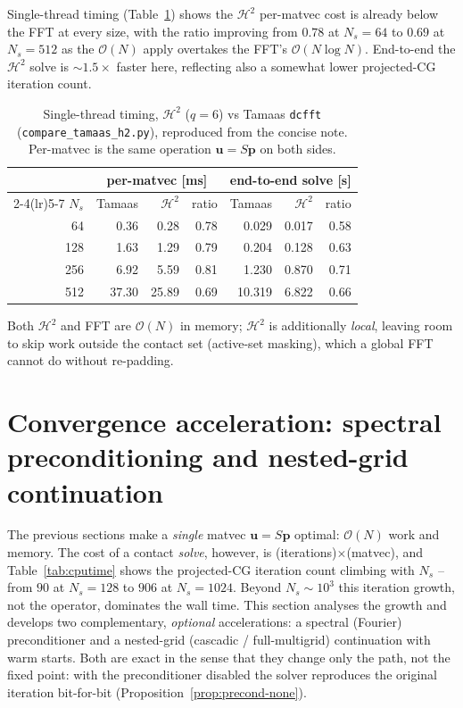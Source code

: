 \documentclass[11pt,a4paper]{article}
\newcommand{\Order}{\mathcal{O}}
\newcommand{\pp}{\mathbf{p}}
\newcommand{\Htwo}{\mathcal{H}^2}
\newcommand{\code}[1]{\texttt{#1}}
\theoremstyle{definition}
\theoremstyle{remark}
\begin{document}
Single-thread timing (Table~\ref{tab:tamaas-time}) shows the $\Htwo$ per-matvec
cost is already below the FFT at every size, with the ratio improving from $0.78$
at $N_s=64$ to $0.69$ at $N_s=512$ as the $\Order(N)$ apply overtakes the FFT's
$\Order(N\log N)$. End-to-end the $\Htwo$ solve is $\sim1.5\times$ faster here,
reflecting also a somewhat lower projected-CG iteration count.

\begin{table}[h]
\centering
\begin{tabular}{rrrrrrr}
\toprule
& \multicolumn{3}{c}{per-matvec [ms]} & \multicolumn{3}{c}{end-to-end solve [s]} \\
\cmidrule(lr){2-4}\cmidrule(lr){5-7}
$N_s$ & Tamaas & $\Htwo$ & ratio & Tamaas & $\Htwo$ & ratio \\
\midrule
64  &  0.36 &  0.28 & 0.78 &  0.029 & 0.017 & 0.58 \\
128 &  1.63 &  1.29 & 0.79 &  0.204 & 0.128 & 0.63 \\
256 &  6.92 &  5.59 & 0.81 &  1.230 & 0.870 & 0.71 \\
512 & 37.30 & 25.89 & 0.69 & 10.319 & 6.822 & 0.66 \\
\bottomrule
\end{tabular}
\caption{Single-thread timing, $\Htwo$ ($q=6$) vs Tamaas \code{dcfft}
(\code{compare\_tamaas\_h2.py}), reproduced from the concise note. Per-matvec is
the same operation $\mathbf u=S\pp$ on both sides.}
\label{tab:tamaas-time}
\end{table}

Both $\Htwo$ and FFT are $\Order(N)$ in memory; $\Htwo$ is additionally
\emph{local}, leaving room to skip work outside the contact set (active-set
masking), which a global FFT cannot do without re-padding.

\section{Convergence acceleration: spectral preconditioning and nested-grid continuation}
\label{sec:accel}

The previous sections make a \emph{single} matvec $\mathbf u=S\pp$ optimal:
$\Order(N)$ work and memory. The cost of a contact \emph{solve}, however, is
(iterations)$\times$(matvec), and Table~\ref{tab:cputime} shows the
projected-CG iteration count climbing with $N_s$ -- from $90$ at $N_s=128$ to
$906$ at $N_s=1024$. Beyond $N_s\sim10^3$ this iteration growth, not the
operator, dominates the wall time. This section analyses the growth and develops
two complementary, \emph{optional} accelerations: a spectral (Fourier)
preconditioner and a nested-grid (cascadic / full-multigrid) continuation with
warm starts. Both are exact in the sense that they change only the path, not the
fixed point: with the preconditioner disabled the solver reproduces the original
iteration bit-for-bit (Proposition~\ref{prop:precond-none}).
\end{document}
